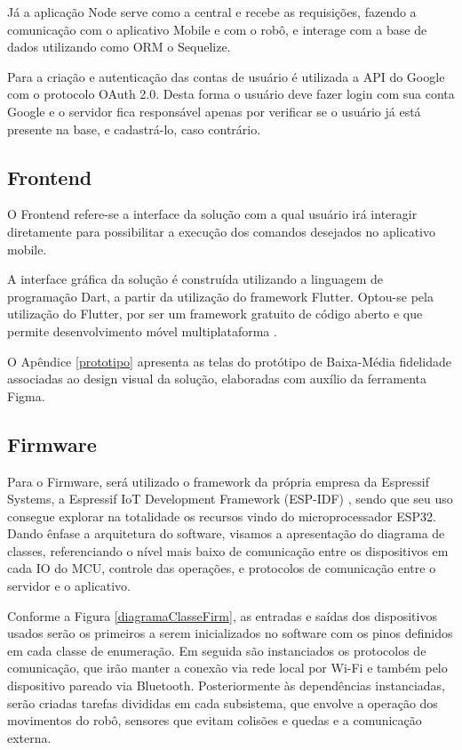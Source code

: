 Já a aplicação Node serve como a central e recebe as requisições, fazendo a comunicação com o aplicativo Mobile e com o robô, e interage com a base de dados utilizando como ORM o Sequelize.


Para a criação e autenticação das contas de usuário é utilizada a API do Google com o protocolo  OAuth 2.0. Desta forma o usuário deve fazer login com sua conta Google e o servidor fica responsável apenas por verificar se o usuário já está presente na base, e cadastrá-lo, caso contrário.


\subsection{Frontend}

O Frontend refere-se a interface da solução com a qual usuário irá interagir diretamente para possibilitar a execução dos comandos desejados no aplicativo mobile. 

A interface gráfica da solução é construída utilizando a linguagem de programação Dart, a partir da utilização do framework Flutter. Optou-se pela utilização do Flutter, por ser um framework gratuito de código aberto e que permite desenvolvimento móvel multiplataforma \cite{alberto_2022}. 
    
O Apêndice \ref{prototipo} apresenta as telas do protótipo de Baixa-Média fidelidade associadas ao design visual da solução, elaboradas com auxílio da ferramenta Figma.


\subsection{Firmware}

Para o Firmware, será utilizado o framework da própria empresa da Espressif Systems, a Espressif IoT Development Framework (ESP-IDF) \cite{ESPRESSIFMANUAL}, sendo que seu uso consegue explorar na totalidade os recursos vindo do microprocessador ESP32. Dando ênfase a arquitetura do software, visamos a apresentação do diagrama de classes, referenciando o nível mais baixo de comunicação entre os dispositivos em cada IO do MCU, controle das operações, e protocolos de comunicação entre o servidor e o aplicativo. 

Conforme a Figura \ref{diagramaClasseFirm}, as entradas e saídas dos dispositivos usados serão os primeiros a serem inicializados no software com os pinos definidos em cada classe de enumeração. Em seguida são instanciados os protocolos de comunicação, que irão manter a conexão via rede local por Wi-Fi e também pelo dispositivo pareado via Bluetooth. Posteriormente às dependências instanciadas, serão criadas tarefas divididas em cada subsistema, que envolve a operação dos movimentos do robô, sensores que evitam colisões e quedas e a comunicação externa.


